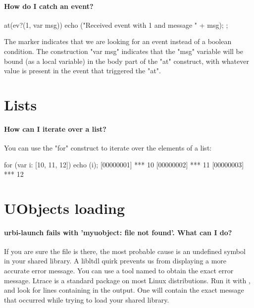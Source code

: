\paragraph{How do I catch an event?}

\begin{urbifixme}
at(ev?(1, var msg)) {
  echo ("Received event with 1 and message " + msg);
};
\end{urbifixme}

The  marker indicates that we are looking for an event instead of a
boolean condition. The construction "var msg" indicates that the "msg"
variable will be bound (as a local variable) in the body part of the "at"
construct, with whatever value is present in the event that triggered the
"at".

\section{Lists}

\paragraph{How can I iterate over a list?}

You can use the "for" construct to iterate over the elements of a list:

\begin{urbiscript}
for (var i: [10, 11, 12]) echo (i);
[00000001] *** 10
[00000002] *** 11
[00000003] *** 12
\end{urbiscript}

\section{UObjects loading}

\paragraph{urbi-launch fails with 'myuobject: file not found'. What can I do?}
If you are sure the file is there, the most probable cause is an
undefined symbol in your shared library. A libltdl quirk prevents us
from displaying a more accurate error message.  You can use a tool
named  to obtain the exact error message.  Ltrace is a
standard package on most Linux distributions.  Run it with
, and look for lines
containing  in the output. One will contain the exact
message that occurred while trying to load your shared library.

